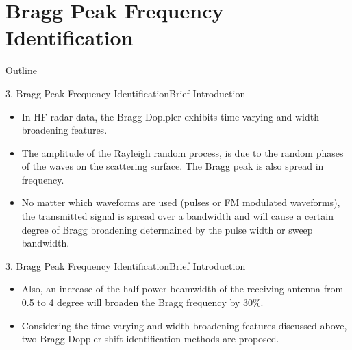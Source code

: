 \documentclass[12pt]{beamer}
\begin{document}
\section{Bragg Peak Frequency Identification}
\begin{frame}{Outline}
  \transfade%
  \tableofcontents[sectionstyle=show/shaded,subsectionstyle=show/shaded] %
\end{frame}

\begin{frame}{3. Bragg Peak Frequency Identification}{Brief Introduction}\begin{itemize}
  \item In HF radar data, the Bragg Doplpler exhibits time-varying and width-broadening features. 
  \item The amplitude of the Rayleigh random process, is due to the random phases of the waves on the scattering surface. The Bragg peak is also spread in frequency. 
  \item No matter which waveforms are used (pulses or FM modulated waveforms), the transmitted signal is spread over a bandwidth and will cause a certain degree of Bragg broadening determained by the pulse width or sweep bandwidth.
\end{itemize}
\end{frame}

\begin{frame}{3. Bragg Peak Frequency Identification}{Brief Introduction}\begin{itemize}
  \item  Also, an increase of the half-power beamwidth of the receiving antenna from 0.5 to 4 degree will broaden the Bragg frequency by 30\%. 
  \item Considering the time-varying and width-broadening features discussed above, two Bragg Doppler shift identification methods are proposed.
\end{itemize}
\end{frame}
\end{document}
